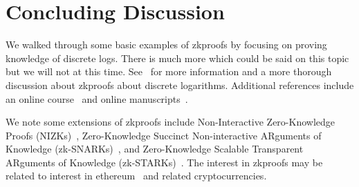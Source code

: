 \section{Concluding Discussion}
\label{sec:zkproofs_concluding_discussion}

We walked through some basic examples of \glspl{zkproof}
by focusing on proving knowledge of \glspl{discrete log}.
There is much more which could be said on this topic
but we will not at this time.
See~\cite{GeneralDiscreteLogProofs} for more information
and a more thorough discussion about \glspl{zkproof}
about discrete logarithms.
Additional references include an online course~\cite{OnlineMOOCZKProofs}
and online manuscripts~\cite{ThalerProofsZK,SnargsBook}.

We note some extensions of \glspl{zkproof} include
Non-Interactive Zero-Knowledge Proofs
(NIZKs)~\cite{rackoff1991nizk,santis1987nizk},
Zero-Knowledge Succinct Non-interactive ARguments of Knowledge
(zk-SNARKs)~\cite{cryptoeprint:2011:443},
and Zero-Knowledge Scalable Transparent ARguments of Knowledge
(zk-STARKs)~\cite{cryptoeprint:2018:046,cryptoeprint:2018:1098}.
The interest in \glspl{zkproof} may be related
to interest in \gls{ethereum}~\cite{EthereumYellowpaper}
and related cryptocurrencies.
